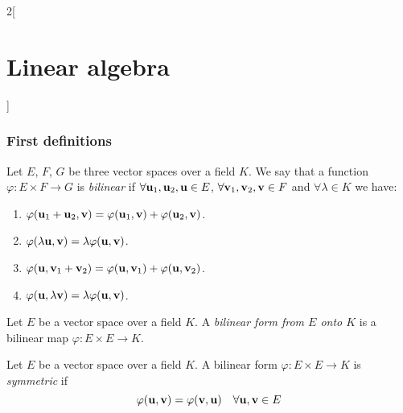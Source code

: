 \documentclass[../../../main.tex]{subfiles}
\begin{document}
\begin{multicols}{2}[\section{Linear algebra}]
\subsubsection*{First definitions}
\begin{definition}
    Let $E$, $F$, $G$ be three vector spaces over a field $K$. We say that a function $\varphi:E\times F\rightarrow G$ is \textit{bilinear} if $\forall\vb{u}_1,\vb{u}_2,\vb{u}\in E$, $\forall \vb{v}_1,\vb{v}_2,\vb{v}\in F$ and $\forall\lambda\in K$ we have:
    \begin{enumerate}
        \item $\varphi(\vb{u}_1+\vb{u}_2,\vb{v})=\varphi(\vb{u}_1,\vb{v})+\varphi(\vb{u}_2,\vb{v})$.
        \item $\varphi(\lambda \vb{u},\vb{v})=\lambda \varphi(\vb{u},\vb{v})$.
        \item $\varphi(\vb{u},\vb{v}_1+\vb{v}_2)=\varphi(\vb{u},\vb{v}_1)+\varphi(\vb{u},\vb{v}_2)$.
        \item $\varphi(\vb{u},\lambda \vb{v})=\lambda \varphi(\vb{u},\vb{v})$.
    \end{enumerate}
\end{definition}
\begin{definition}
    Let $E$ be a vector space over a field $K$. A \textit{bilinear form from $E$ onto $K$} is a bilinear map $\varphi:E\times E\rightarrow K$.
\end{definition}
\begin{definition}
    Let $E$ be a vector space over a field $K$. A bilinear form $\varphi:E\times E\rightarrow K$ is \textit{symmetric} if $$\varphi(\vb{u},\vb{v})=\varphi(\vb{v},\vb{u})\quad\forall \vb{u},\vb{v}\in E$$
\end{definition}

\end{multicols}
\end{document}
